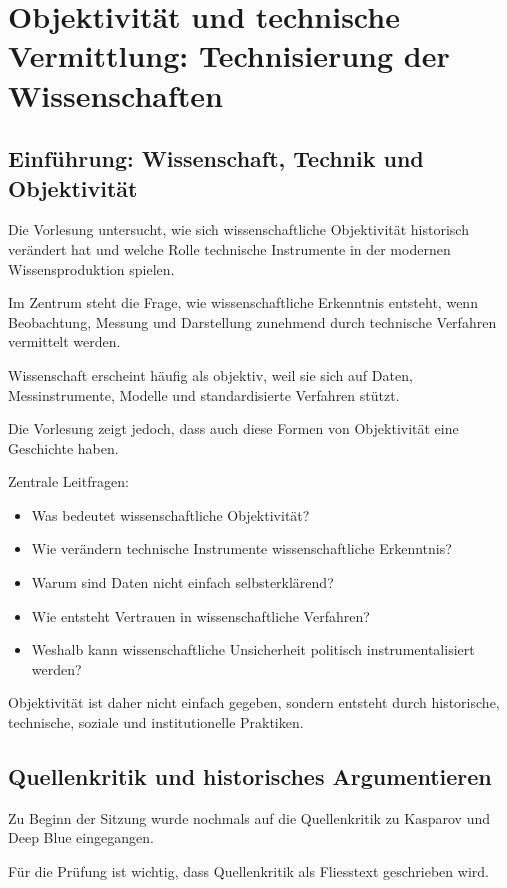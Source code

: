 \section{Objektivität und technische Vermittlung: Technisierung der Wissenschaften}

\subsection{Einführung: Wissenschaft, Technik und Objektivität}

Die Vorlesung untersucht,
wie sich wissenschaftliche Objektivität historisch verändert hat
und welche Rolle technische Instrumente
in der modernen Wissensproduktion spielen.

Im Zentrum steht die Frage,
wie wissenschaftliche Erkenntnis entsteht,
wenn Beobachtung,
Messung und Darstellung zunehmend
durch technische Verfahren vermittelt werden.

Wissenschaft erscheint häufig als objektiv,
weil sie sich auf Daten,
Messinstrumente,
Modelle und standardisierte Verfahren stützt.

Die Vorlesung zeigt jedoch,
dass auch diese Formen von Objektivität
eine Geschichte haben.

Zentrale Leitfragen:

\begin{itemize}
\item Was bedeutet wissenschaftliche Objektivität?
\item Wie verändern technische Instrumente wissenschaftliche Erkenntnis?
\item Warum sind Daten nicht einfach selbsterklärend?
\item Wie entsteht Vertrauen in wissenschaftliche Verfahren?
\item Weshalb kann wissenschaftliche Unsicherheit politisch instrumentalisiert werden?
\end{itemize}

Objektivität ist daher nicht einfach gegeben,
sondern entsteht durch historische,
technische,
soziale und institutionelle Praktiken.

\subsection{Quellenkritik und historisches Argumentieren}

Zu Beginn der Sitzung wurde nochmals
auf die Quellenkritik zu Kasparov und Deep Blue eingegangen.

Für die Prüfung ist wichtig,
dass Quellenkritik als Fliesstext geschrieben wird.

